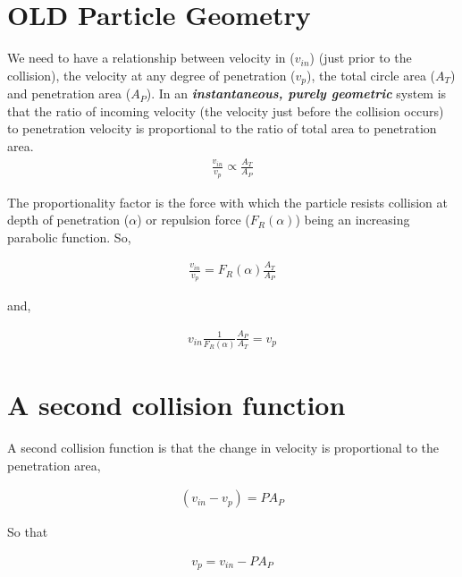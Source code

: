 
\section{OLD Particle Geometry} \label{Fundamental}

We need to have a relationship between velocity in ($v_{in}$) (just prior to the collision), the velocity at any degree of penetration ($v_p$), the total circle area ($A_T$) and penetration area ($A_P$). In an \textit{\textbf{instantaneous, purely geometric}} system is that the ratio of incoming velocity (the velocity just before the collision occurs) to penetration velocity is proportional to the ratio of total area to penetration area.
\begin{equation}
\begin{aligned}
\frac{v_{in}}{v_p} \propto \frac{A_T}{A_P}
\end{aligned}
\end{equation}


The proportionality factor is the force with which the particle resists collision at depth of penetration ($\alpha$) or repulsion force ($F_R(\alpha)$) being an increasing parabolic function. So,

\begin{equation}
\begin{aligned}
\frac{v_{in}}{v_p} = F_R(\alpha) \frac{A_T}{A_P}
\end{aligned}
\end{equation}

and,

\begin{equation}
\begin{aligned}
v_{in}\frac{1}{F_R(\alpha)}\frac{A_P}{A_T} =  {v_p}
\end{aligned}
\end{equation}


\section{A second collision function}
A second collision function is that the change in velocity is proportional to the penetration area,

\begin{equation}
\begin{aligned}
(v_{in} - v_{p}) = P A_P
\end{aligned}
\end{equation}


So that 

\begin{equation}
\begin{aligned}
v_{p} = v_{in}-P A_P
\end{aligned}
\end{equation}


